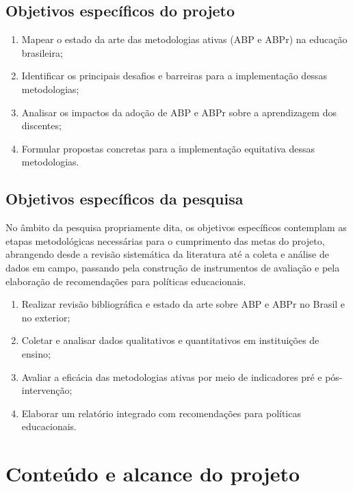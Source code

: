 \subsection{Objetivos específicos do projeto}
\label{subsec:obj_especificos_projeto}

\begin{enumerate}
    \item Mapear o estado da arte das metodologias ativas (ABP e ABPr) na educação brasileira;
    \item Identificar os principais desafios e barreiras para a implementação dessas metodologias;
    \item Analisar os impactos da adoção de ABP e ABPr sobre a aprendizagem dos discentes;
    \item Formular propostas concretas para a implementação equitativa dessas metodologias.
\end{enumerate}

\subsection{Objetivos específicos da pesquisa}
\label{subsec:obj_especificos_pesquisa}

No âmbito da pesquisa propriamente dita, os objetivos específicos contemplam as etapas metodológicas necessárias para o cumprimento das metas do projeto, abrangendo desde a revisão sistemática da literatura até a coleta e análise de dados em campo, passando pela construção de instrumentos de avaliação e pela elaboração de recomendações para políticas educacionais.

\begin{enumerate}
    \item Realizar revisão bibliográfica e estado da arte sobre ABP e ABPr no Brasil e no exterior;
    \item Coletar e analisar dados qualitativos e quantitativos em instituições de ensino;
    \item Avaliar a eficácia das metodologias ativas por meio de indicadores pré e pós-intervenção;
    \item Elaborar um relatório integrado com recomendações para políticas educacionais.
\end{enumerate}


\section{Conteúdo e alcance do projeto}
\label{sec:conteudo_alcance}

